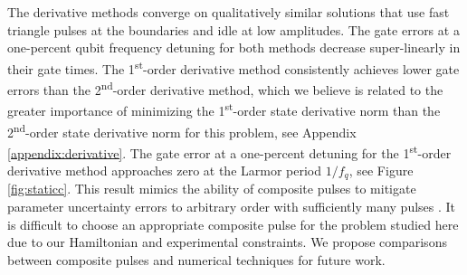 The derivative methods converge on qualitatively similar solutions that
use fast triangle pulses at the boundaries and idle at low amplitudes.
The gate errors at a one-percent qubit frequency detuning
for both methods decrease super-linearly in their gate times.
The 1\textsuperscript{st}-order derivative method
consistently achieves lower gate errors than the
2\textsuperscript{nd}-order derivative method,
which we believe is related to the greater importance
of minimizing the 1\textsuperscript{st}-order state
derivative norm than the 2\textsuperscript{nd}-order
state derivative norm for this problem, see Appendix \ref{appendix:derivative}.
The gate error at a one-percent detuning for the 1\textsuperscript{st}-order
derivative method approaches zero at the Larmor period $1 / f_{q}$, see Figure \ref{fig:staticc}.
This result mimics the
ability of composite pulses to mitigate parameter uncertainty errors to arbitrary
order with sufficiently many pulses \cite{merrill2014progress}.
It is difficult to choose an appropriate composite pulse
for the problem studied here due to our Hamiltonian and experimental constraints.
We propose comparisons between composite pulses and numerical techniques
for future work.

